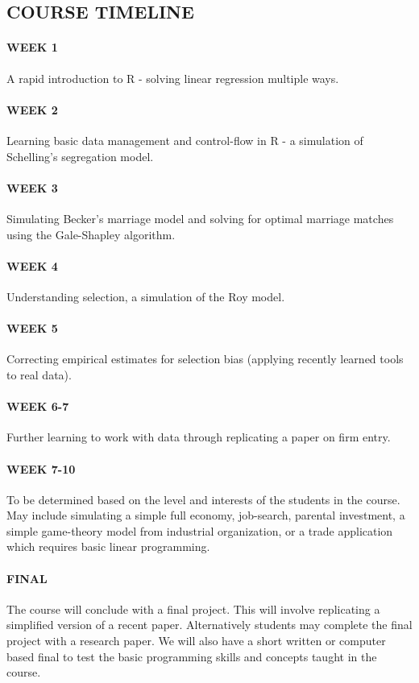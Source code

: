 \documentclass{scrartcl}
\begin{document}
\subsection*{COURSE TIMELINE}

\paragraph{WEEK 1} 
A rapid introduction to R - solving linear regression multiple ways.

\paragraph{WEEK 2}
Learning basic data management and control-flow in R - a simulation of Schelling's segregation model.


\paragraph{WEEK 3}
Simulating Becker's marriage model and solving for optimal marriage matches using the Gale-Shapley algorithm.

\paragraph{WEEK 4}
Understanding selection, a simulation of the Roy model.

\paragraph{WEEK 5}
Correcting empirical estimates for selection bias (applying recently learned tools to real data).

\paragraph{WEEK 6-7}
Further learning to work with data through replicating a paper on firm entry. 

\paragraph{WEEK 7-10}
To be determined based on the level and interests of the students in the course. May include simulating a simple full economy, job-search, parental investment, a simple game-theory model from industrial organization, or a trade application which requires basic linear programming. 

\paragraph{FINAL}
The course will conclude with a final project. This will involve replicating a simplified version of a recent paper. Alternatively students may complete the final project with a research paper. We will also have a short written or computer based final to test the basic programming skills and concepts taught in the course. 
\end{document}
